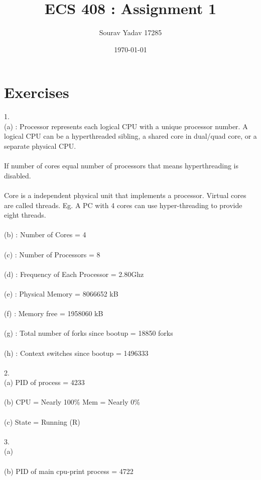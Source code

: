 \documentclass[12pt, letterpaper]{article}
\title{ECS 408 : Assignment 1 }
\author{Sourav Yadav 17285}
\date{\today}
\begin{document}
	\maketitle
	\section*{Exercises} 
	1. \\ (a) : Processor represents each logical CPU with a unique processor number. A logical CPU can be a hyperthreaded sibling, a shared core in dual/quad core, or a separate physical CPU. \\ \\
	If number of cores equal number of processors that means hyperthreading is disabled. \\ \\
	Core is a independent physical unit that implements a processor. Virtual cores are called threads. Eg. A PC with 4 cores can use hyper-threading to provide eight threads. \\ \\ 
	(b) : Number of Cores = 4  \\ \\ 
	(c) : Number of Processors = 8 \\ \\ 
	(d) : Frequency of Each Processor = 2.80Ghz \\ \\ 
	(e) : Physical Memory = 8066652 kB \\ \\
	(f) : Memory free = 1958060 kB \\ \\ 
	(g) : Total number of forks since bootup = 18850 forks \\ \\
	(h) : Context switches since bootup = 1496333 \\ \\ 
	2. \\ (a) PID of process = 4233 \\ \\ 
	   (b) CPU = Nearly 100\%  Mem = Nearly 0\% \\ \\  
	   (c) State = Running (R) \\ \\ 
	3. \\ (a) \\ \\ 
	   (b) PID of main cpu-print process = 4722 \\
\end{document}
